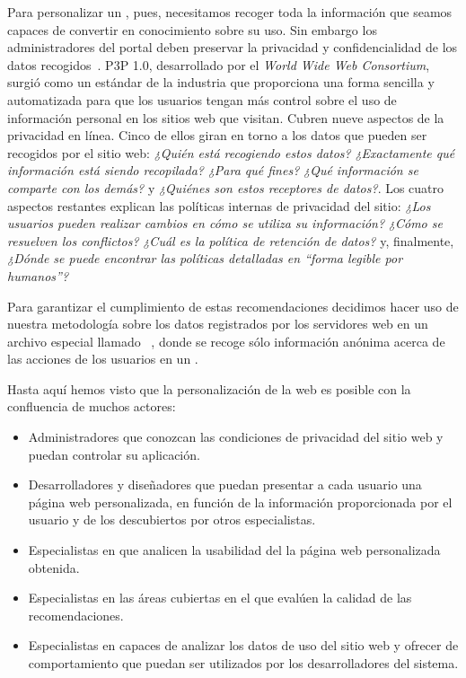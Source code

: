 Para personalizar un \portalWeb, pues, necesitamos recoger toda la información que seamos capaces de convertir en conocimiento sobre su uso. Sin embargo los administradores del portal deben preservar la privacidad y confidencialidad de los datos recogidos~\citep{W3CP3P,LamFrankowskiRiedl-DoYouTrustYourRecommendations-2006,RozenbergGudes-ARMInVerticallyPartitionedDBs-2006}. {P3P 1.0}, desarrollado por el \textsl{World Wide Web Consortium}, surgió como un estándar de la industria que proporciona una forma sencilla y automatizada para que los usuarios tengan más control sobre el uso de información personal en los sitios web que visitan. Cubren nueve aspectos de la privacidad en línea. Cinco de ellos giran en torno a los datos que pueden ser recogidos por el sitio web: \textsl{¿Quién está recogiendo estos datos?} \textsl{¿Exactamente qué información está siendo recopilada?} \textsl{¿Para qué fines?} \textsl{¿Qué información se comparte con los demás?} y \textsl{¿Quiénes son estos receptores de datos?}. Los cuatro aspectos restantes explican las políticas internas de privacidad del sitio: \textsl{¿Los usuarios pueden realizar cambios en cómo se utiliza su información?} \textsl{¿Cómo se resuelven los conflictos?} \textsl{¿Cuál es la política de retención de datos?} y, finalmente, \textsl{¿Dónde se puede encontrar las políticas detalladas en "`forma legible por humanos"'?} 

Para garantizar el cumplimiento de estas recomendaciones decidimos hacer uso de nuestra metodología sobre los datos registrados por los servidores web en un archivo especial llamado \flog~\citep{W3Clogfile}, donde se recoge sólo información anónima acerca de las acciones de los usuarios en un \portalWeb.

Hasta aquí hemos visto que la personalización de la web es posible con la confluencia de muchos actores:
\begin{itemize}
	\item Administradores que conozcan las condiciones de privacidad del sitio web y puedan controlar su aplicación.
  \item Desarrolladores y diseñadores que puedan presentar a cada usuario una página web personalizada, en función de la información proporcionada por el usuario y de los \patrones descubiertos por otros especialistas.
  \item Especialistas en \UX que analicen la usabilidad del la página web personalizada obtenida.
  \item Especialistas en las áreas cubiertas en el \portalWeb que evalúen la calidad de las recomendaciones.
  \item Especialistas en \dm capaces de analizar los datos de uso del sitio web y ofrecer \patrones de comportamiento que puedan ser utilizados por los desarrolladores del sistema.
\end{itemize}

